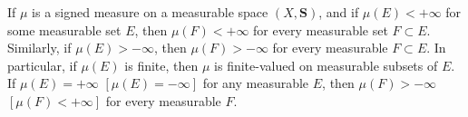 If $\mu$ is a signed measure on a measurable space $(X, \mathbf{S})$, and if $\mu(E) < +\infty$ for some measurable set $E$, then $\mu(F) < +\infty$ for every measurable set $F \subset E$. Similarly, if $\mu(E) > -\infty$, then $\mu(F) > -\infty$ for every measurable $F \subset E$. In particular, if $\mu(E)$ is finite, then $\mu$ is finite-valued on measurable subsets of $E$. If $\mu(E) = +\infty$ $[\mu(E) = -\infty]$ for any measurable $E$, then $\mu(F) > -\infty$ $[\mu(F) < +\infty]$ for every measurable $F$.
